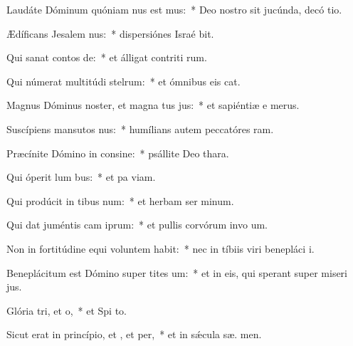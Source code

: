 \item Laudáte Dóminum quóniam nus est mus:~* Deo nostro sit jucúnda, decó tio.
\item Ædíficans Jesalem nus:~* dispersiónes Israé bit.
\item Qui sanat contos de:~* et álligat contriti rum.
\item Qui númerat multitúdi stelrum:~* et ómnibus eis  cat.
\item Magnus Dóminus noster, et magna tus jus:~* et sapiéntiæ e   merus.
\item Suscípiens mansutos nus:~* humílians autem peccatóres   ram.
\item Præcínite Dómino in consine:~* psállite Deo   thara.
\item Qui óperit lum bus:~* et pa  viam.
\item Qui prodúcit in tibus num:~* et herbam ser minum.
\item Qui dat juméntis cam iprum:~* et pullis corvórum invo um.
\item Non in fortitúdine equi voluntem habit:~* nec in tíbiis viri benepláci  i.
\item Beneplácitum est Dómino super tites um:~* et in eis, qui sperant super miseri jus.
\item Glória tri, et o,~* et Spi to.
\item Sicut erat in princípio, et , et per,~* et in sǽcula sæ. men.
